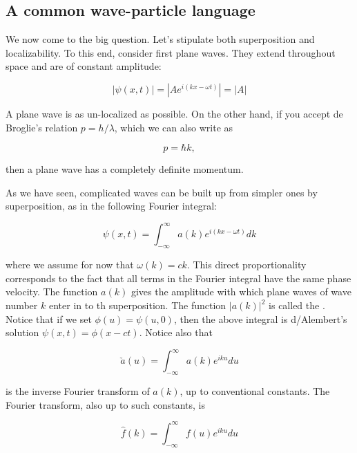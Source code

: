 \subsection{A common wave-particle language}

We now come to the big question.   Let's stipulate both superposition and localizability.  To this end, consider first plane waves.  They extend throughout space and are of constant amplitude:

\begin{equation}
|\psi(x,t)| = |Ae^{i(kx - \omega t)}| = |A|
\end{equation}

A plane wave is as un-localized as possible.   On the other hand, if you accept de Broglie's relation $p = h/\lambda$, which we can also write as

\begin{equation}
p = \hbar k,
\end{equation}

then a plane wave has a completely definite momentum.

As we have seen, complicated waves can be built up from simpler ones by superposition, as in the following Fourier integral:

\begin{equation}
\psi(x,t) = \int_{-\infty}^\infty a(k) e^{i(kx - \omega t)}dk
\end{equation}

where we assume for now that $\omega(k) = ck$.  This  direct proportionality corresponds to the fact that all terms in the Fourier integral have the same phase velocity.  The function $a(k)$ gives the amplitude with which plane waves of wave number $k$ enter in to th superposition.  The function $|a(k)|^2$ is called the .  Notice that if we set  $\phi(u) = \psi(u,0)$, then the above integral is d/Alembert's solution $\psi(x,t) = \phi(x - ct)$.  Notice also  that

\begin{equation}
\check a(u) = \int_{-\infty}^\infty a(k) e^{iku} du
\end{equation}

is the inverse Fourier transform of $a(k)$, up to conventional constants.  The Fourier transform, also up to such constants, is

\begin{equation}
\hat f(k) = \int_{-\infty}^\infty f(u) e^{iku} du
\end{equation}

